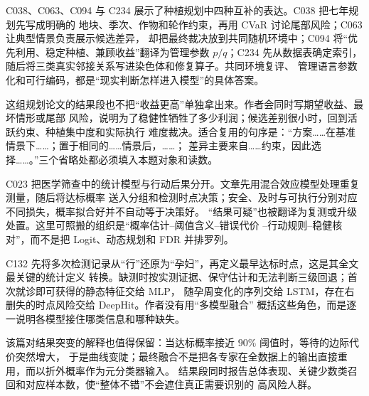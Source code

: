 C038、C063、C094 与 C234 展示了种植规划中四种互补的表达。C038 把七年规划先写成明确的
地块、季次、作物和轮作约束，再用 CVaR 讨论尾部风险；C063 让典型情景负责展示候选差异，
却把最终裁决放到共同随机环境中；C094 将“优先利用、稳定种植、兼顾收益”翻译为管理参数
$p/q$；C234 先从数据表确定索引，随后将三类真实邻接关系写进染色体和修复算子。共同环境复评、
管理语言参数化和可行编码，都是“现实判断怎样进入模型”的具体答案。

这组规划论文的结果段也不把“收益更高”单独拿出来。作者会同时写期望收益、最坏情形或尾部
风险，说明为了稳健性牺牲了多少利润；候选差别很小时，回到活跃约束、种植集中度和实际执行
难度裁决。适合复用的句序是：“方案……在基准情景下……；置于相同的……情景后，……；
差异主要来自……约束，因此选择……。”三个省略处都必须填入本题对象和读数。

C023 把医学筛查中的统计模型与行动后果分开。文章先用混合效应模型处理重复测量，随后将达标概率
送入分组和检测时点决策；安全、及时与可执行分别对应不同损失，概率拟合好并不自动等于决策好。
“结果可疑”也被翻译为复测或升级处置。这里可照搬的组织是“概率估计--阈值含义--错误代价
--行动规则--稳健核对”，而不是把 Logit、动态规划和 FDR 并排罗列。

C132 先将多次检测记录从“行”还原为“孕妇”，再定义最早达标时点，这是其全文最关键的统计定义
转换。缺测时按实测证据、保守估计和无法判断三级回退；首次就诊即可获得的静态特征交给 MLP，
随孕周变化的序列交给 LSTM，存在右删失的时点风险交给 DeepHit。作者没有用“多模型融合”
概括这些角色，而是逐一说明各模型接住哪类信息和哪种缺失。

该篇对结果突变的解释也值得保留：当达标概率接近 $90\%$ 阈值时，等待的边际代价突然增大，
于是曲线变陡；最终融合不是把各专家在全数据上的输出直接重用，而以折外概率作为元分类器输入。
结果段同时报告总体表现、关键少数类召回和对应样本数，使“整体不错”不会遮住真正需要识别的
高风险人群。
